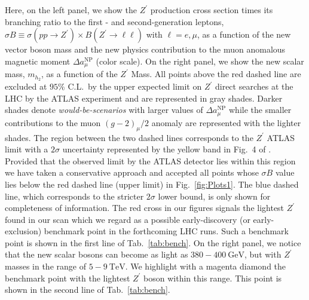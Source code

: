 \documentclass[10pt]{book}
\renewcommand{\(}{\left(}
\renewcommand{\)}{\right)}
\renewcommand{\[}{\left[}
\renewcommand{\]}{\right]}
\begin{document}
Here, on the left panel, we show the $Z^\prime$ production cross section times its branching ratio to the first - and second-generation leptons, $\sigma B \equiv \sigma \left( pp \to Z^\prime \right) \times B \left( Z^\prime \to \ell \ell \right) $ with $\ell = e,\mu$, as a function of the new vector boson mass and the new physics contribution to the muon anomalous magnetic moment $\Delta a^{\textrm{NP}}_\mu$ (color scale). 
%
On the right panel, we show the new scalar mass, $m_{h_2}$, as a function of the $Z^\prime$ Mass. 
%
All points above the red dashed line are excluded at $95\%$ C.L.~by the upper expected limit on $Z^\prime$ direct searches at the LHC by the ATLAS experiment and are represented in gray shades. 
%
Darker shades denote \textit{would-be-scenarios} with larger values of $\Delta a^{\textrm{NP}}_\mu$ while the smaller contributions to the muon $\left(g-2\right)_\mu / 2$ anomaly are represented with the lighter shades. 
%
The region between the two dashed lines corresponds to the $Z^\prime$ ATLAS limit with a $2\sigma$ uncertainty represented by the yellow band in Fig.~4 of \cite{Aaboud:2017buh}.
%
Provided that the observed limit by the ATLAS detector lies within this region we have taken a conservative approach and accepted all points whose $\sigma B$ value lies below the red dashed line (upper limit) in Fig.~\ref{fig:Plots1}.
%
The blue dashed line, which corresponds to the stricter $2 \sigma$ lower bound, is only shown for completeness of information. The red cross in our figures signals the lightest $Z^\prime$ found in our scan which we regard as a possible early-discovery (or early-exclusion) benchmark point in the forthcoming LHC runs. Such a benchmark point is shown in the first line of Tab.~\ref{tab:bench}.
%
On the right panel, we notice that the new scalar bosons can become as light as $380 - 400~\textrm{GeV}$, but with $Z^\prime$ masses in the range of $5 - 9~\textrm{TeV}$. We highlight with a magenta diamond the benchmark point with the lightest $Z^\prime$ boson within this range. 
%
This point is shown in the second line of Tab.~\ref{tab:bench}.
%
\end{document}
